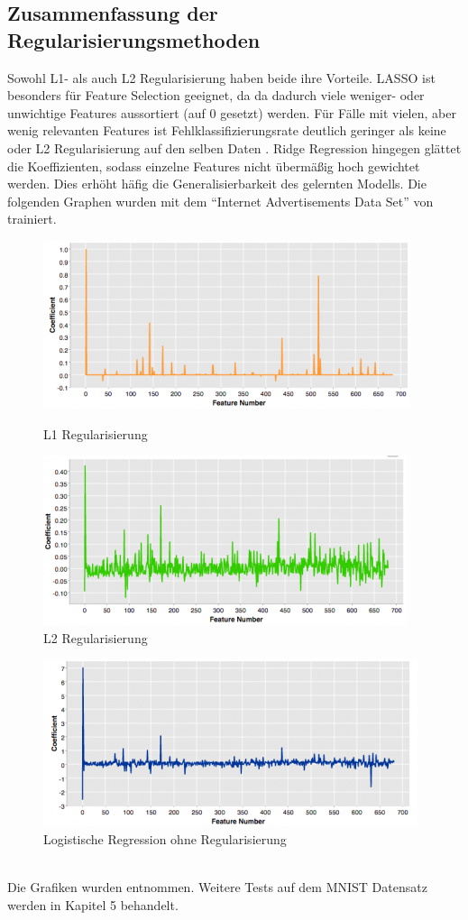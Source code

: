 \subsection{Zusammenfassung der Regularisierungsmethoden}
Sowohl L1- als auch L2 Regularisierung haben beide ihre Vorteile. LASSO ist besonders für Feature Selection geeignet, da da dadurch viele weniger- oder unwichtige Features aussortiert (auf 0 gesetzt) werden. Für Fälle mit vielen, aber wenig relevanten Features ist Fehlklassifizierungsrate deutlich geringer als keine oder L2 Regularisierung auf den selben Daten \cite{NG}. Ridge Regression hingegen glättet die Koeffizienten, sodass einzelne Features nicht übermäßig hoch gewichtet werden. Dies erhöht häfig die Generalisierbarkeit des gelernten Modells.\newpage
Die folgenden Graphen wurden mit dem "`Internet Advertisements Data Set"' von \cite{DUA2019} trainiert.\\
\begin{figure}[ht]
\centering
	\begin{minipage}[b]{.4\linewidth}
  		\includegraphics[scale=0.8]{bilder/laplace}
  		\caption{L1 Regularisierung}
  	\end{minipage}
  	\hspace{.1\linewidth}%
  	\begin{minipage}[b]{.4\linewidth}
  		\includegraphics[scale=0.8]{bilder/gauss}
		\caption{L2 Regularisierung}
	\end{minipage}
\end{figure}
\begin{figure}[ht]
\centering
\includegraphics[scale=.8]{bilder/no_reg}
\caption{Logistische Regression ohne Regularisierung}
\end{figure}\\
Die Grafiken wurden \cite{L12} entnommen.
Weitere Tests auf dem MNIST Datensatz \cite{MNIST} werden in Kapitel 5 behandelt.

